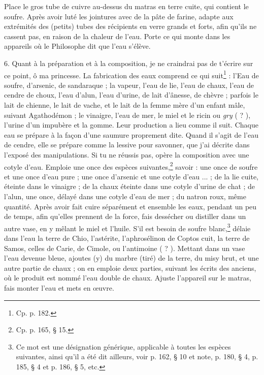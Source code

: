 \documentclass[landscape, a4paper, 11pt, oneside, polutonikogreek, french]{article}
\begin{document}
Place le gros tube de cuivre au-dessus du matras en terre cuite, qui contient le soufre. Après avoir luté les jointures avec de la pâte de farine, adapte aux extrémités des (petits) tubes des récipients en verre grands et forts, afin qu'ils ne cassent pas, en raison de la chaleur de l'eau. Porte ce qui monte dans les appareils où le Philosophe dit que l'eau s'élève.

6. Quant à la préparation et à la composition, je ne craindrai pas de t'écrire sur ce point, ô ma princesse. La fabrication des eaux comprend ce qui suit\footnote{Cp. p. 182.} : l'Eau de soufre, d'arsenic, de sandaraque ; la vapeur, l'eau de lie, l'eau de chaux, l'eau de cendre de choux, l'eau d'alun, l'eau d'urine, de lait d'ânesse, de chèvre ; parfois le lait de chienne, le lait de vache, et le lait de la femme mère d'un enfant mâle, suivant Agathodémon ; le vinaigre, l'eau de mer, le miel et le ricin ou \emph{gry} ( ? ), l'urine d'un impubère et la gomme. Leur production a lieu comme il suit. Chaque eau se prépare à la façon d'une saumure proprement dite. Quand il s'agit de l'eau de cendre, elle se prépare comme la lessive pour savonner, que j'ai décrite dans l'exposé des manipulations. Si tu ne réussis pas, opère la composition avec une cotyle d'eau. Emploie une once des espèces suivantes,\footnote{Cp. p. 165, § 15.} savoir : une once de soufre et une once d'eau pure ; une once d'arsenic et une cotyle d'eau ... ; de la lie cuite, éteinte dans le vinaigre ; de la chaux éteinte dans une cotyle d'urine de chat ; de l'alun, une once, délayé dans une cotyle d'eau de mer ; du natron roux, même quantité. Après avoir fait cuire séparément et ensemble les eaux, pendant un peu de temps, afin qu'elles prennent de la force, fais dessécher ou distiller dans un autre vase, en y mêlant le miel et l'huile. S'il est besoin de soufre blanc,\footnote{Ce mot est une désignation générique, applicable à toutes les espèces suivantes, ainsi qu'il a été dit ailleurs, voir p. 162, § 10 et note, p. 180, § 4, p. 185, § 4 et p. 186, § 5, etc.} délaie dans l'eau la terre de Chio, l'astérite, l'aphrosélinon de Coptos cuit, la terre de Samos, celles de Carie, de Cimole, ou l'antimoine ( ? ). Mettant dans un vase l'eau devenue bleue, ajoutes (y) du marbre (tiré) de la terre, du misy brut, et une autre partie de chaux ; on en emploie deux parties, suivant les écrits des anciens, où le produit est nommé l'eau double de chaux. Ajuste l'appareil sur le matras, fais monter l'eau et mets en œuvre.
\end{document}
